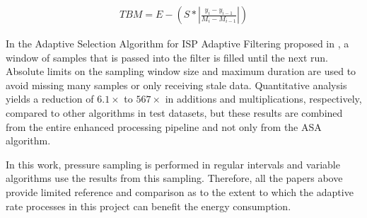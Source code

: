 \begin{align}\label{align:tbm-dsra}
    TBM = E - \left(S * \left|\frac{y_i - y_{i-1}}{M_i - M_{i - 1}}\right|\right)
\end{align}

In the Adaptive Selection Algorithm for ISP Adaptive Filtering proposed in \cite{QAISAR2019106462}, a window of samples that is passed into the filter is filled until the next run. Absolute limits on the sampling window size and maximum duration are used to avoid missing many samples or only receiving stale data. 
Quantitative analysis yields a reduction of $6.1\times$ to $567\times$ in additions and multiplications, respectively, compared to other algorithms in test datasets, but these results are combined from the entire enhanced processing pipeline and not only from the ASA algorithm.

In this work, pressure sampling is performed in regular intervals and variable algorithms use the results from this sampling. 
Therefore, all the papers above provide limited reference and comparison as to the extent to which the adaptive rate processes in this project can benefit the energy consumption.
